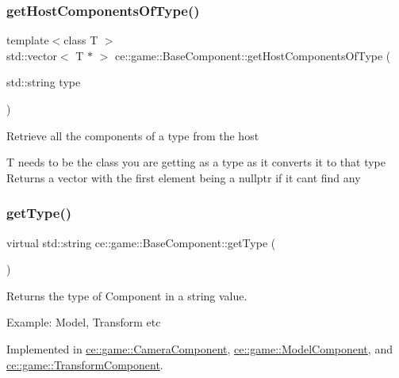 \subsubsection{\texorpdfstring{get\+Host\+Components\+Of\+Type()}{getHostComponentsOfType()}}
{\footnotesize\ttfamily template$<$class T $>$ \\
std\+::vector$<$ T $\ast$ $>$ ce\+::game\+::\+Base\+Component\+::get\+Host\+Components\+Of\+Type (\begin{DoxyParamCaption}\item[{std\+::string}]{type }\end{DoxyParamCaption})\hspace{0.3cm}{\ttfamily [inline]}}

Retrieve all the components of a type from the host

T needs to be the class you are getting as a type as it converts it to that type Returns a vector with the first element being a nullptr if it can\textquotesingle{}t find any \mbox{\label{classce_1_1game_1_1_base_component_a1022b55c1926a019a2b3a71fb6b9150e}} 
\subsubsection{\texorpdfstring{get\+Type()}{getType()}}
{\footnotesize\ttfamily virtual std\+::string ce\+::game\+::\+Base\+Component\+::get\+Type (\begin{DoxyParamCaption}{ }\end{DoxyParamCaption})\hspace{0.3cm}{\ttfamily [pure virtual]}}



Returns the type of Component in a string value. 

Example\+: Model, Transform etc 

Implemented in \hyperlink{classce_1_1game_1_1_camera_component_a15140bffd017245dd17ed9aa0f953a1b}{ce\+::game\+::\+Camera\+Component}, \hyperlink{classce_1_1game_1_1_model_component_aaac15cad336e35df7be55dda34f53643}{ce\+::game\+::\+Model\+Component}, and \hyperlink{classce_1_1game_1_1_transform_component_ae4a2729b3f88a77b8405de317ab03510}{ce\+::game\+::\+Transform\+Component}.



